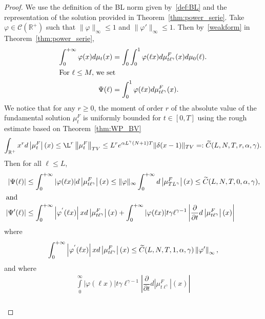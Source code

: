 \documentclass[AHL,Unicode,longabstracts,published]{cedram}
\newcommand*\dst{\displaystyle}
\newcommand*\p{\partial}
\newcommand*\R{\mathbb{R}}
\newcommand{\clC}{\mathcal{C}}
\let\oldtilde\tilde
\renewcommand*{\tilde}[1]{\mathchoice{\widetilde{#1}}{\widetilde{#1}}{\oldtilde{#1}}{\oldtilde{#1}}}
\begin{document}
\begin{proof}
We use the definition of the BL norm given by~\eqref{def:BL} and the representation of the solution provided in Theorem~\ref{thm:power_serie}. Take $\varphi \in \clC(\R^+)$ such that $\|\varphi\|_{\infty}\leq 1$ and $\|\varphi'\|_{\infty}\leq 1$. Then by~\eqref{weakform} in Theorem~\ref{thm:power_serie},
\begin{align*}
\dst\int_0^{+\infty} \varphi(x)d\mu_t(x) &= \dst\int_0 \dst\int_0^{1} \varphi(\ell x) d\mu_{t \ell^{\gamma}}^{F}(x) d\mu_0(\ell).
\\
\intertext{For $\ell \leq M,$ we set}
\Psi(\ell) &= \dst\int_0^{1} \varphi(\ell x) d\mu_{t \ell^{\gamma}}^{F}(x).
\end{align*}
We notice that for any $r\geq0$, the moment of order $r$ of the absolute value of the fundamental solution $\mu_t^F$ is uniformly bounded for $t\in[0,T]$ using the rough estimate based on Theorem~\ref{thm:WP_BV}
\begin{equation*}
\dst\int_{\R^+} x^rd\left|\mu_t^F\right|(x) \leq \L^r \left\|\mu_t^F\right\|_{TV} \leq
L^r e^{\alpha L^{\gamma} (N+1)T}\|\delta(x-1)\|_{TV} =:\tilde{C}(L,N,T,r,\alpha,\gamma).
\end{equation*}
Then for all $\ell \leq L$,
\begin{align*}
\left|\Psi(\ell)\right| &\leq \dst\int_0^{+\infty} |\varphi(\ell x)| d\left|\mu_{t \ell^{\gamma}}^{F}\right|(x) \leq \|\varphi\|_{\infty} \dst\int_0^{+\infty} d \left|\mu_{T L^{\gamma}}^{F}\right|(x) \leq \tilde{C}(L,N,T,0,\alpha,\gamma),
\\
\intertext{and}
\left|\Psi'(\ell)\right| &\leq \dst\int_0^{+\infty}\left|\varphi^{'}(\ell x)\right|x d \left|\mu_{t \ell^{\gamma}}^{F}\right|(x) + \dst\int_0^{+\infty} |\varphi(\ell x)| t \gamma \ell^{\gamma-1} \left|\dfrac{\p}{\p t} d \left|\mu_{t \ell^{\gamma}}^{F}\right|(x) \right|\\
\end{align*}
where
\begin{equation*}
\dst\int_0^{+\infty} \left|\varphi^{{'}}(\ell x)\right|x d\left|\mu_{t \ell^{\gamma}}^{F}\right|(x) \leq \tilde{C}(L,N,T,1,\alpha,\gamma)\left\|\varphi'\right\|_{\infty},
\end{equation*}
and where
\begin{multline*}
\int\limits_0^{\infty} |\varphi(\ell x)| t \gamma \ell^{\gamma-1} \left|\dfrac{\p}{\p t} d \left|\mu_{t \ell^{\gamma}}^{F}\right|(x) \right| \\
\begin{aligned}

\end{aligned}
\end{multline*}
\end{proof}
\end{document}

